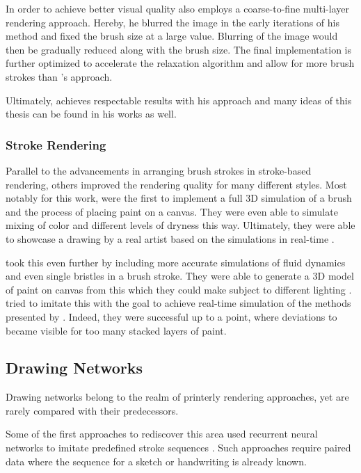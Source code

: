 In order to achieve better visual quality \citeauthor*{Hertzmann} also employs a coarse-to-fine multi-layer rendering approach.
Hereby, he blurred the image in the early iterations of his method and fixed the brush size at a large value.
Blurring of the image would then be gradually reduced along with the brush size.
The final implementation is further optimized to accelerate the relaxation algorithm and allow for more brush strokes than \citeauthor*{paintbynumbers}'s approach.

Ultimately, \citeauthor*{Hertzmann} achieves respectable results with his approach and many ideas of this thesis can be found in his works as well.

\subsubsection{Stroke Rendering}
Parallel to the advancements in arranging brush strokes in stroke-based rendering, others improved the rendering quality for many different styles.
Most notably for this work, \citeauthor*{baxter} were the first to implement a full 3D simulation of a brush and the process of placing paint on a canvas.
They were even able to simulate mixing of color and different levels of dryness this way.
Ultimately, they were able to showcase a drawing by a real artist based on the simulations in real-time \cite{baxter}.

\citeauthor*{wetbrush} took this even further by including more accurate simulations of fluid dynamics and even single bristles in a brush stroke.
They were able to generate a 3D model of paint on canvas from this which they could make subject to different lighting \cite{wetbrush}.
\citeauthor*{adobe} tried to imitate this with the goal to achieve real-time simulation of the methods presented by \citeauthor*{wetbrush}.
Indeed, they were successful up to a point, where deviations to \cite{wetbrush} became visible for too many stacked layers of paint.




\subsection{Drawing Networks}
Drawing networks belong to the realm of printerly rendering approaches, yet are rarely compared with their predecessors.

Some of the first approaches to rediscover this area used recurrent neural networks to imitate predefined stroke sequences \cite{sketchRNN, graves}.
Such approaches require paired data where the sequence for a sketch or handwriting is already known.

